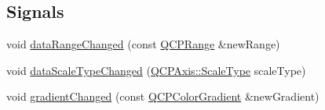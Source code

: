 \subsection*{Signals}
\begin{DoxyCompactItemize}
\item 
void \hyperlink{classQCPColorMap_a83ae5be3903da493f732e1a5c14fd807}{data\+Range\+Changed} (const \hyperlink{classQCPRange}{Q\+C\+P\+Range} \&new\+Range)
\item 
void \hyperlink{classQCPColorMap_a978d5d5c9f68cffef8c902b855c04490}{data\+Scale\+Type\+Changed} (\hyperlink{classQCPAxis_a36d8e8658dbaa179bf2aeb973db2d6f0}{Q\+C\+P\+Axis\+::\+Scale\+Type} scale\+Type)
\item 
void \hyperlink{classQCPColorMap_a31a12726736b1ac274e7b1d8dfb67468}{gradient\+Changed} (const \hyperlink{classQCPColorGradient}{Q\+C\+P\+Color\+Gradient} \&new\+Gradient)
\end{DoxyCompactItemize}
